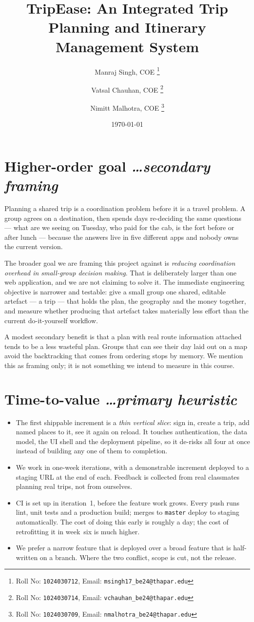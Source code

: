 \documentclass[11pt,a4paper]{article}
\title{TripEase: An Integrated Trip Planning and
  Itinerary Management System}
\author{
  Manraj Singh, COE%
  \thanks{Roll No: \texttt{1024030712}, %
    Email: \texttt{msingh17\_be24@thapar.edu}}
  \and
  Vatsal Chauhan, COE%
  \thanks{Roll No: \texttt{1024030714}, %
    Email: \texttt{vchauhan\_be24@thapar.edu}}
  \and
  Nimitt Malhotra, COE%
  \thanks{Roll No: \texttt{1024030709}, %
    Email: \texttt{nmalhotra\_be24@thapar.edu}}
}
\date{\today}
\newcommand{\BvrHint}[1]{%
  {\normalfont\normalsize\itshape\hfill #1}}
\begin{document}
\maketitle

\section{Higher-order goal%
  \BvrHint{\ldots secondary framing}}
Planning a shared trip is a coordination problem before
it is a travel problem. A group agrees on a
destination, then spends days re-deciding the same
questions --- what are we seeing on Tuesday, who paid
for the cab, is the fort before or after lunch ---
because the answers live in five different apps and
nobody owns the current version.

The broader goal we are framing this project against is
\emph{reducing coordination overhead in small-group
  decision making}. That is deliberately larger than
one web application, and we are not claiming to solve
it. The immediate engineering objective is narrower and
testable: give a small group one shared, editable
artefact --- a trip --- that holds the plan, the
geography and the money together, and measure whether
producing that artefact takes materially less effort
than the current do-it-yourself workflow.

A modest secondary benefit is that a plan with real
route information attached tends to be a less wasteful
plan. Groups that can see their day laid out on a map
avoid the backtracking that comes from ordering stops
by memory. We mention this as framing only; it is not
something we intend to measure in this course.

\section{Time-to-value %
\BvrHint{\ldots primary heuristic}}
\begin{itemize}[leftmargin=0.7cm]
    \item The first shippable increment is a
      \emph{thin vertical slice}: sign in, create a
      trip, add named places to it, see it again on
      reload. It touches authentication, the data
      model, the UI shell and the deployment pipeline,
      so it de-risks all four at once instead of
      building any one of them to completion.
    \item We work in one-week iterations, with a
      demonstrable increment deployed to a staging URL
      at the end of each. Feedback is collected from
      real classmates planning real trips, not from
      ourselves.
    \item CI is set up in iteration~1, before the
      feature work grows. Every push runs lint, unit
      tests and a production build; merges to
      \texttt{master} deploy to staging automatically.
      The cost of doing this early is roughly a day;
      the cost of retrofitting it in week~six is much
      higher.
    \item We prefer a narrow feature that is deployed
      over a broad feature that is half-written on a
      branch. Where the two conflict, scope is cut, not
      the release.
\end{itemize}
\end{document}
